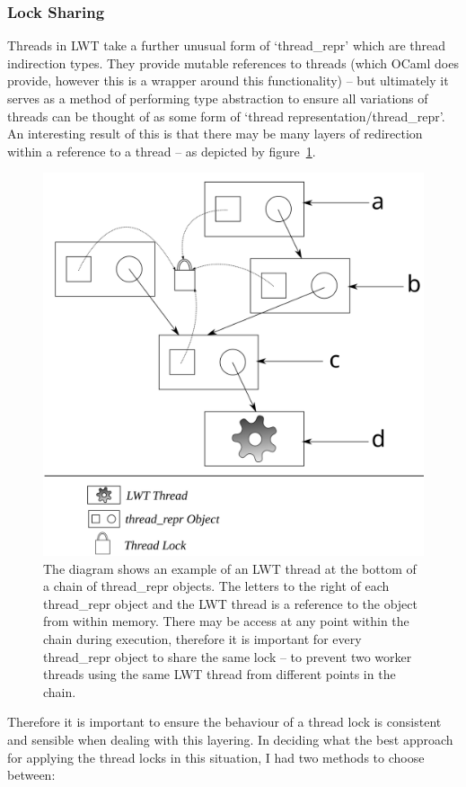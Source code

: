 \documentclass[12pt,twoside,notitlepage]{report}
\begin{document}
\subsubsection{Lock Sharing}
\label{subsubsec:lock_sharing}
Threads in LWT take a further unusual form of `thread\_repr' which are thread indirection types. They provide mutable references to threads (which OCaml does provide, however this is a wrapper around this functionality) -- but
ultimately it serves as a method of performing type abstraction to ensure all variations of threads can be thought of as some form of `thread representation/thread\_repr'. An interesting result of this is that there may be many layers
of redirection within a reference to a thread -- as depicted by figure~\ref{fig:thread_repr}.
\begin{figure}[h!]
\includegraphics[width=\linewidth]{thread_repr}
\caption{The diagram shows an example of an LWT thread at the bottom of a chain of thread\_repr objects. The letters to the right of each thread\_repr object and the LWT thread is a reference to the object from within memory. There
may be access at any point within the chain during execution, therefore it is important for every thread\_repr object to share the same lock -- to prevent two worker threads using the same LWT thread from different points in the
chain.}
\label{fig:thread_repr}
\end{figure}
Therefore it is important to ensure the behaviour of a thread lock is consistent and sensible when dealing
with this layering. In deciding what the best approach for applying the thread locks in this situation, I had two methods to choose between:
\end{document}
